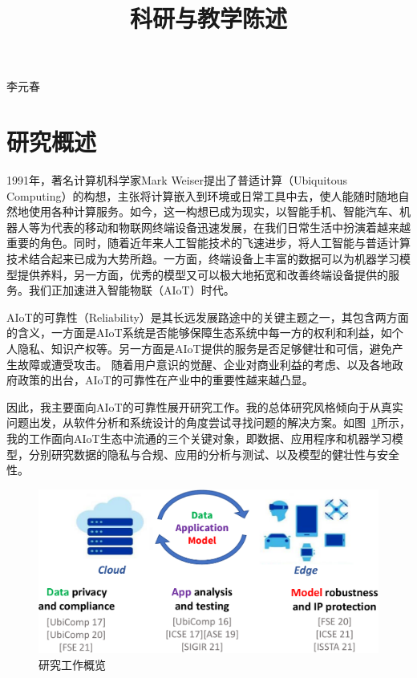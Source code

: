 \documentclass[12pt]{article}
\begin{document}

\title{科研与教学陈述}

\maketitle


\begin{center} {李元春} \end{center}


\section{研究概述}

1991年，著名计算机科学家Mark Weiser提出了普适计算（Ubiquitous Computing）的构想，主张将计算嵌入到环境或日常工具中去，使人能随时随地自然地使用各种计算服务。如今，这一构想已成为现实，以智能手机、智能汽车、机器人等为代表的移动和物联网终端设备迅速发展，在我们日常生活中扮演着越来越重要的角色。同时，随着近年来人工智能技术的飞速进步，将人工智能与普适计算技术结合起来已成为大势所趋。一方面，终端设备上丰富的数据可以为机器学习模型提供养料，另一方面，优秀的模型又可以极大地拓宽和改善终端设备提供的服务。我们正加速进入智能物联（AIoT）时代。

AIoT的可靠性（Reliability）是其长远发展路途中的关键主题之一，其包含两方面的含义，一方面是AIoT系统是否能够保障生态系统中每一方的权利和利益，如个人隐私、知识产权等。另一方面是AIoT提供的服务是否足够健壮和可信，避免产生故障或遭受攻击。
随着用户意识的觉醒、企业对商业利益的考虑、以及各地政府政策的出台，AIoT的可靠性在产业中的重要性越来越凸显。

因此，我主要面向AIoT的可靠性展开研究工作。我的总体研究风格倾向于从真实问题出发，从软件分析和系统设计的角度尝试寻找问题的解决方案。如图~\ref{fig:overview}所示，我的工作面向AIoT生态中流通的三个关键对象，即数据、应用程序和机器学习模型，分别研究数据的隐私与合规、应用的分析与测试、以及模型的健壮性与安全性。


\begin{figure}
    \centering
    \includegraphics[width=5in]{figures/research_overview.pdf}
    \caption{研究工作概览}
    \label{fig:overview}
\end{figure}
\end{document}
